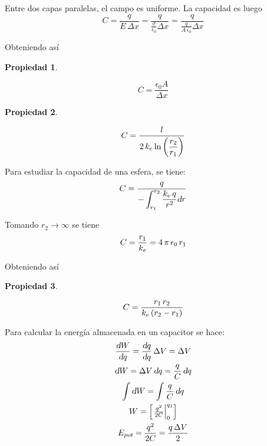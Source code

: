 \documentclass[a5paper,12pt,twoside]{book}
\newtheorem{prop}{{Propiedad}}[chapter]
\begin{document}
Entre dos capas paralelas, el campo es uniforme. La capacidad es luego
\begin{equation*}
    C = \frac{q}{E \, \Delta x} = \frac{q}{\frac{\sigma}{\epsilon_0}\Delta x} = \frac{q}{\tfrac{q}{A \, \epsilon_0}\Delta x}
\end{equation*}

Obteniendo así

\begin{mdframed}[style=MyFrame1]
    \begin{prop}
    \end{prop}
    \begin{equation*}
        C = \frac{\epsilon_0 A}{\Delta x}
    \end{equation*}
\end{mdframed}

\begin{mdframed}[style=MyFrame1]
    \begin{prop}
    \end{prop}
    \begin{equation*}
        C = \frac{l}{2 \, k_e \ln{\left(\dfrac{r_2}{r_1}\right)}}
    \end{equation*}
\end{mdframed}

Para estudiar la capacidad de una esfera, se tiene:
\begin{equation*}
    C = \frac{q}{-\displaystyle\int_{r_1}^{r_2} \frac{k_e \, q}{r^2} \textsl{d} r}
\end{equation*}

Tomando $r_2 \to \infty$ se tiene
\begin{equation*}
    C = \frac{r_1}{k_e} = 4 \, \pi \, \epsilon_0 \, r_1
\end{equation*}

Obteniendo así

\begin{mdframed}[style=MyFrame1]
    \begin{prop}
    \end{prop}
    \begin{equation*}
        C = \frac{r_1 \, r_2}{k_e \left(r_2 - r_1\right)}
    \end{equation*}
\end{mdframed}

Para calcular la energía almacenada en un capacitor se hace:
\begin{gather*}
    \frac{\textsl{d} W}{\textsl{d} q} = \frac{\textsl{d} q}{\textsl{d} q} \, \Delta V = \Delta V
    \\
    \textsl{d} W = \Delta V \, \textsl{d} q = \frac{q}{C} \, \textsl{d} q
    \\
    \int \textsl{d} W = \int \frac{q}{C} \, \textsl{d} q
    \\
    W = \begin{bmatrix} \left. \frac{q^2}{2C} \right|_{0}^{q_1} \end{bmatrix}
    \\
    {{E}_\textsl{{pot}}} = \frac{q^2}{2C} = \frac{q \, \Delta V}{2}
\end{gather*}
\end{document}
